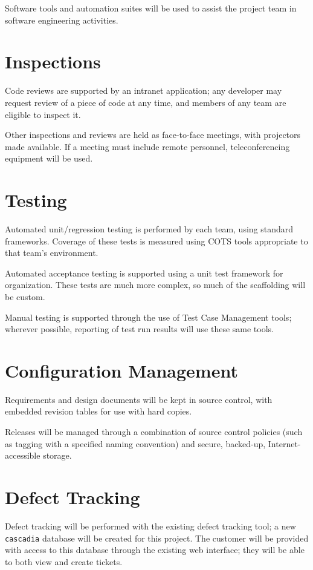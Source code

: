 \documentclass[11pt]{wacomepd}
\begin{document}
Software tools and automation suites will be used to assist the project team in software engineering
activities.

\section{Inspections}
Code reviews are supported by an intranet application; any developer may request review of a
piece of code at any time, and members of any team are eligible to inspect it.

Other inspections and reviews are held as face-to-face meetings, with projectors made available.  If
a meeting must include remote personnel, teleconferencing equipment will be used.


\section{Testing}
Automated unit/regression testing is performed by each team, using standard frameworks.  Coverage of
these tests is measured using COTS tools appropriate to that team's environment.

Automated acceptance testing is supported using a unit test framework for organization.  These tests
are much more complex, so much of the scaffolding will be custom.

Manual testing is supported through the use of Test Case Management tools; wherever possible,
reporting of test run results will use these same tools.

\section{Configuration Management}
Requirements and design documents will be kept in source control, with embedded revision tables for
use with hard copies.

Releases will be managed through a combination of source control policies (such as tagging with a
specified naming convention) and secure, backed-up, Internet-accessible storage.

\section{Defect Tracking}
Defect tracking will be performed with the existing defect tracking tool; a new {\tt cascadia}
database will be created for this project.  The customer will be provided with access to this
database through the existing web interface; they will be able to both view and create tickets.
\end{document}
